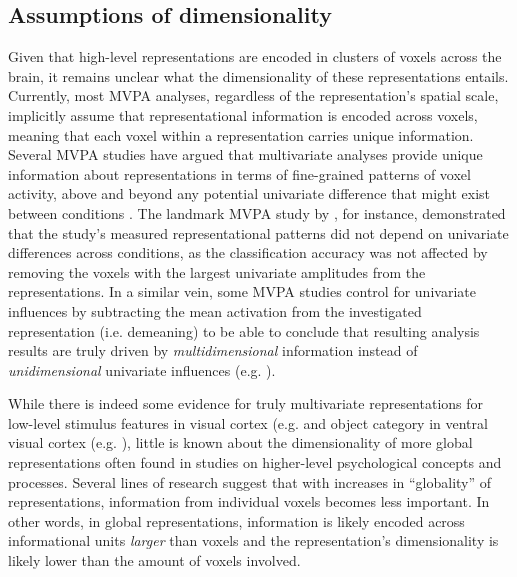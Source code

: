\documentclass[jou,12pt,a4paper]{apa6}
\begin{document}
\subsection{Assumptions of dimensionality}
Given that high-level representations are encoded in clusters of voxels across the brain, it remains unclear what the dimensionality of these representations entails. Currently, most MVPA analyses, regardless of the representation's spatial scale, implicitly assume that representational information is encoded across voxels, meaning that each voxel within a representation carries unique information. Several MVPA studies have argued that multivariate analyses provide unique information about representations in terms of fine-grained patterns of voxel activity, above and beyond any potential univariate difference that might exist between conditions \cite{mur2009,kriegeskorte2006}. The landmark MVPA study by , for instance, demonstrated that the study's measured representational patterns did not depend on univariate differences across conditions, as the classification accuracy was not affected by removing the voxels with the largest univariate amplitudes from the representations. In a similar vein, some MVPA studies control for univariate influences by subtracting the mean activation from the investigated representation (i.e. demeaning) to be able to conclude that resulting analysis results are truly driven by \emph{multidimensional} information instead of \emph{unidimensional} univariate influences (e.g. ).  

While there is indeed some evidence for truly multivariate representations for low-level stimulus features in visual cortex (e.g.  and object category in ventral visual cortex (e.g. ), little is known about the dimensionality of more global representations often found in studies on higher-level psychological concepts and processes. Several lines of research suggest that with increases in ``globality'' of representations, information from individual voxels becomes less important. In other words, in global representations, information is likely encoded across informational units \emph{larger} than voxels and the representation's dimensionality is likely lower than the amount of voxels involved.
\end{document}
